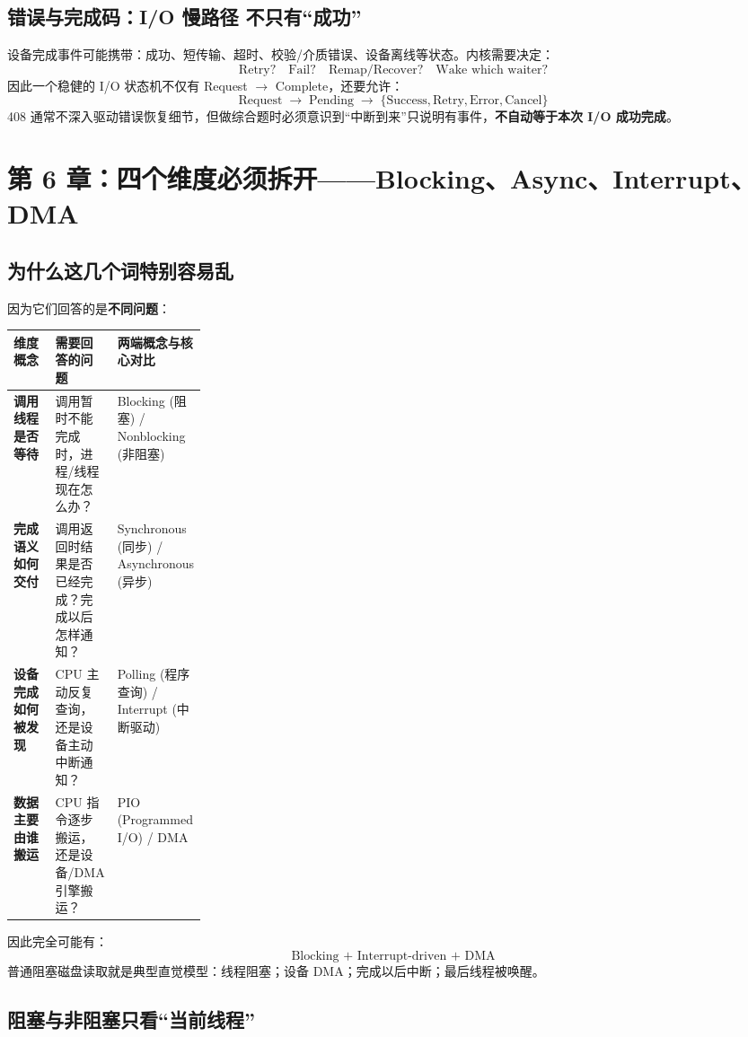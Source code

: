 \documentclass[UTF8,fontset=fandol,11pt,a4paper]{ctexart}
\newcommand{\kw}[1]{\textbf{#1}}
\newcommand{\arr}{\;\longrightarrow\;}
\begin{document}
\subsection{错误与完成码：I/O 慢路径 不只有“成功”}
设备完成事件可能携带：成功、短传输、超时、校验/介质错误、设备离线等状态。内核需要决定：
\[
\text{Retry?}\quad\text{Fail?}\quad\text{Remap/Recover?}\quad\text{Wake which waiter?}
\]
因此一个稳健的 I/O 状态机不仅有 Request $\to$ Complete，还要允许：
\[
\boxed{\text{Request}\arr\text{Pending}\arr\{\text{Success},\text{Retry},\text{Error},\text{Cancel}\}}
\]
408 通常不深入驱动错误恢复细节，但做综合题时必须意识到“中断到来”只说明有事件，\kw{不自动等于本次 I/O 成功完成}。

\section{第 6 章：四个维度必须拆开——Blocking、Async、Interrupt、DMA}

\subsection{为什么这几个词特别容易乱}
因为它们回答的是\kw{不同问题}：

\begingroup
\small
\renewcommand{\arraystretch}{1.25}
\setlength{\tabcolsep}{6pt}
\begin{tabularx}{\linewidth}{>{\bfseries}p{0.25\linewidth} X X}
\toprule
维度概念 & 需要回答的问题 & 两端概念与核心对比 \\
\midrule
调用线程是否等待 & 调用暂时不能完成时，进程/线程现在怎么办？ & Blocking (阻塞) / Nonblocking (非阻塞) \\
完成语义如何交付 & 调用返回时结果是否已经完成？完成以后怎样通知？ & Synchronous (同步) / Asynchronous (异步) \\
设备完成如何被发现 & CPU 主动反复查询，还是设备主动中断通知？ & Polling (程序查询) / Interrupt (中断驱动) \\
数据主要由谁搬运 & CPU 指令逐步搬运，还是设备/DMA 引擎搬运？ & PIO (Programmed I/O) / DMA \\
\bottomrule
\end{tabularx}
\endgroup

因此完全可能有：
\[
\boxed{\text{Blocking + Interrupt-driven + DMA}}
\]
普通阻塞磁盘读取就是典型直觉模型：线程阻塞；设备 DMA；完成以后中断；最后线程被唤醒。

\subsection{阻塞与非阻塞只看“当前线程”}
\end{document}
